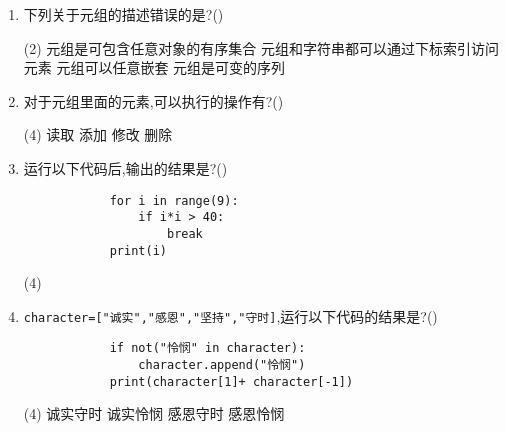 \documentclass[11pt]{ctexart}
\begin{document}
\begin{enumerate}
        \item 下列关于元组的描述错误的是?(\qquad)
        \begin{tasks}(2)
            \task 元组是可包含任意对象的有序集合
            \task 元组和字符串都可以通过下标索引访问元素
            \task 元组可以任意嵌套
            \task 元组是可变的序列
        \end{tasks}

        \item 对于元组里面的元素,可以执行的操作有?(\qquad)
        \begin{tasks}(4)
            \task 读取
            \task 添加
            \task 修改
            \task 删除
        \end{tasks}

        \item 运行以下代码后,输出的结果是?(\qquad)
        \begin{lstlisting}
            for i in range(9):
                if i*i > 40:
                    break
            print(i)
        \end{lstlisting}
        \begin{tasks}(4)
        \end{tasks}

        \item \lstinline!character=["诚实","感恩","坚持","守时]!,运行以下代码的结果是?(\qquad)
        \begin{lstlisting}
            if not("怜悯" in character):
                character.append("怜悯")
            print(character[1]+ character[-1])
        \end{lstlisting}
        \begin{tasks}(4)
            \task 诚实守时
            \task 诚实怜悯
            \task 感恩守时
            \task 感恩怜悯
        \end{tasks}
    \end{enumerate}
\end{document}
